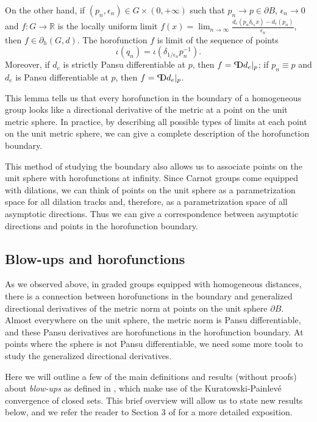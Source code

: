 \documentclass{article}
\theoremstyle{definition}
\newcommand{\bhor}{\partial_h}
\newcommand{\pD}{\text{\scalebox{-1}[1]{$\mathrm{P}$}\!\!$\mathrm{D}$}}
\newcommand{\R}{{\mathbb R}}
\begin{document}
	On the other hand, if $(p_n,\epsilon_n)\in G\times(0,+\infty)$ such that $p_n\to p\in\partial B$, $\epsilon_n\to0$ and $f:G\to\R$ is the locally uniform limit $f(x) = \lim_{n\to\infty} \frac{d_e(p_n\delta_{\epsilon_n}x)-d_e(p_n)}{\epsilon_n}$, then $f\in\bhor(G,d)$.
	The horofunction $f$ is limit of the sequence of points
	\begin{equation*}
	\iota(q_n) = \iota(\delta_{1/\epsilon_n} p_n^{-1} ).
	\end{equation*}
	Moreover, if $d_e$ is strictly Pansu differentiable at $p$, then $f=\pD d_e|_p$;
	if $p_n\equiv p$ and $d_e$ is Pansu differentiable at $p$, then $f=\pD d_e|_p$.
	
	
This lemma tells us that every horofunction in the boundary of a homogeneous group looks like a directional derivative of the metric at a point on the unit metric sphere. In practice, by describing all possible types of limits at each point on the unit metric sphere, we can give a complete description of the horofunction boundary. 


This method of studying the boundary also allows us to associate points on the unit sphere with horofunctions at infinity. Since Carnot groups come equipped with dilations, we can think of points on the unit sphere as a parametrization space for all dilation tracks and, therefore, as a parametrization space of all asymptotic directions. Thus we can give a correspondence between asymptotic directions and points in the horofunction boundary.


\subsection{Blow-ups and horofunctions}\label{sec:blow-ups}
As we observed above, in graded groups equipped with homogeneous distances, there is a connection between horofunctions in the boundary and generalized directional derivatives of the metric norm at points on the unit sphere $\partial B$. Almost everywhere on the unit sphere, the metric norm is Pansu differentiable, and these Pansu derivatives are horofunctions in the horofunction boundary. At points where the sphere is not Pansu differentiable, we need some more tools to study the generalized directional derivatives.

Here we will outline a few of the main definitions and results (without proofs) about {\em blow-ups} as defined in \cite{FNG}, which make use of the Kuratowski-Painlev\'e convergence of closed sets. This brief overview will allow us to state new results below, and we refer the reader to Section 3 of \cite{FNG} for a more detailed exposition.
\end{document}
